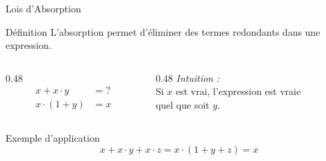 \begin{frame}{Lois d'Absorption}

    \begin{block}{Définition}
        L'absorption permet d'éliminer des termes redondants dans une expression.
    \end{block}

    \vspace{0.5cm}

    \begin{columns}[T]
        \begin{column}{0.48\textwidth}
            \begin{align*}
                x + x \cdot y &= ? \\
                x \cdot (1 + y) &= x
            \end{align*}
        \end{column}
        \begin{column}{0.48\textwidth}
            \centering
            \textit{Intuition :}\\
            \vspace{0.2cm}
            Si \(x\) est vrai, l'expression est vraie\\
            quel que soit \(y\).
        \end{column}
    \end{columns}

    \vspace{0.5cm}

    \begin{exampleblock}{Exemple d'application}
        \[
            x + x \cdot y + x \cdot z = x \cdot (1 + y + z) = x
        \]
    \end{exampleblock}

\end{frame}

